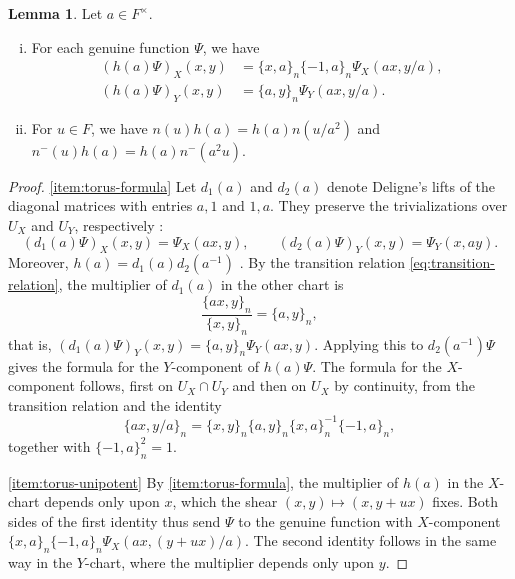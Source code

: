 \documentclass[reqno]{amsart}
\theoremstyle{plain}
\theoremstyle{definition}
\theoremstyle{itplain}
\newtheorem{lemma}[theorem]{Lemma}
\numberwithin{equation}{section}
\numberwithin{theorem}{section}
\begin{document}
\begin{lemma}\label{lemma:torus}
  Let $a \in F^\times$.
  \begin{enumerate}[(i)]
  \item\label{item:torus-formula} For each genuine function $\Psi$, we have
    \begin{align*}
      (h(a) \Psi)_X(x, y) &= \{x, a\}_n \{-1, a\}_n \Psi_X(a x, y / a), \\
      (h(a) \Psi)_Y(x, y) &= \{a, y\}_n \Psi_Y(a x, y / a).
    \end{align*}
  \item\label{item:torus-unipotent} For $u \in F$, we have $n(u) h(a) = h(a) n(u / a^2)$ and $n^-(u) h(a) = h(a) n^-(a^2 u)$.
  \end{enumerate}
\end{lemma}
\begin{proof}
  \eqref{item:torus-formula} Let $d_1(a)$ and $d_2(a)$ denote Deligne's lifts of the diagonal matrices with entries $a, 1$ and $1, a$.  They preserve the trivializations over $U_X$ and $U_Y$, respectively \cite[\S1.12, (1.14.3)]{SB_1978-1979__21__244_0}:
  \begin{equation*}
    (d_1(a) \Psi)_X(x, y) = \Psi_X(a x, y),
    \qquad
    (d_2(a) \Psi)_Y(x, y) = \Psi_Y(x, a y).
  \end{equation*}
  Moreover, $h(a) = d_1(a) d_2(a^{-1})$ \cite[(1.9.3)]{SB_1978-1979__21__244_0}.  By the transition relation \eqref{eq:transition-relation}, the multiplier of $d_1(a)$ in the other chart is
  \begin{equation*}
    \frac{\{a x, y\}_n}{\{x, y\}_n} = \{a, y\}_n,
  \end{equation*}
  that is, $(d_1(a) \Psi)_Y(x, y) = \{a, y\}_n \Psi_Y(a x, y)$.  Applying this to $d_2(a^{-1}) \Psi$ gives the formula for the $Y$-component of $h(a) \Psi$.  The formula for the $X$-component follows, first on $U_X \cap U_Y$ and then on $U_X$ by continuity, from the transition relation and the identity
  \begin{equation*}
    \{a x, y / a\}_n = \{x, y\}_n \{a, y\}_n \{x, a\}_n^{-1} \{-1, a\}_n,
  \end{equation*}
  together with $\{-1, a\}_n^2 = 1$.

  \eqref{item:torus-unipotent} By \eqref{item:torus-formula}, the multiplier of $h(a)$ in the $X$-chart depends only upon $x$, which the shear $(x, y) \mapsto (x, y + u x)$ fixes.  Both sides of the first identity thus send $\Psi$ to the genuine function with $X$-component $\{x, a\}_n \{-1, a\}_n \Psi_X(a x, (y + u x) / a)$.  The second identity follows in the same way in the $Y$-chart, where the multiplier depends only upon $y$.
\end{proof}
\end{document}
